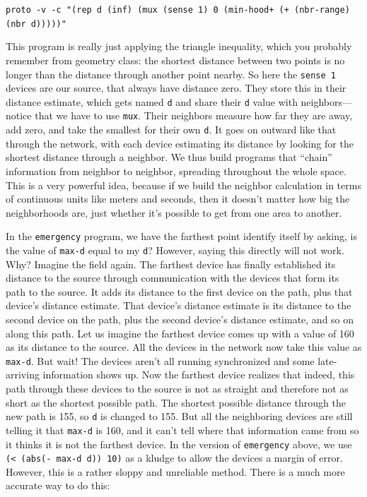 \documentclass{article}
\newcommand\code[1]{\begin{center}\var{#1}\end{center}}
\newcommand\var[1]{{\tt #1}}
\begin{document}
\code{proto -v -c "(rep d (inf) (mux (sense 1) 0 (min-hood+ (+ (nbr-range) (nbr d)))))"}

This program is really just applying the triangle inequality, which
you probably remember from geometry class: the shortest distance
between two points is no longer than the distance through another
point nearby.  So here the \var{sense 1} devices are our source, that
always have distance zero.  They store this in their distance
estimate, which gets named \var{d} and share their \var{d} value with
neighbors---notice that we have to use \var{mux}.  Their neighbors
measure how far they are away, add zero, and take the smallest for
their own \var{d}.  It goes on outward like that through the network,
with each device estimating its distance by looking for the shortest
distance through a neighbor.  We thus build programs that ``chain''
information from neighbor to neighbor, spreading throughout the whole
space.  This is a very powerful idea, because if we build the neighbor
calculation in terms of continuous units like meters and seconds, then
it doesn't matter how big the neighborhoods are, just whether it's
possible to get from one area to another.

In the \var{emergency} program, we have the farthest point identify
itself by asking, is the value of \var{max-d} equal to my \var{d}?
However, saying this directly will not work.  Why?  Imagine the field
again. The farthest device has finally established its distance to the
source through communication with the devices that form its path to
the source.  It adds its distance to the first device on the path,
plus that device's distance estimate.  That device's distance estimate
is its distance to the second device on the path, plus the second
device's distance estimate, and so on along this path.  Let us imagine
the farthest device comes up with a value of 160 as its distance to
the source.  All the devices in the network now take this value as
\var{max-d}.  But wait!  The devices aren't all running synchronized
and some late-arriving information shows up.  Now the farthest device
realizes that indeed, this path through these devices to the source is
not as straight and therefore not as short as the shortest possible
path.  The shortest possible distance through the new path is 155, so
\var{d} is changed to 155.  But all the neighboring devices are still
telling it that \var{max-d} is 160, and it can't tell where that
information came from so it thinks it is not the farthest device.  In
the version of \var{emergency} above, we use \var{(< (abs(- max-d d))
  10)} as a kludge to allow the devices a margin of error.  However,
this is a rather sloppy and unreliable method.  There is a much more
accurate way to do this:
\end{document}
